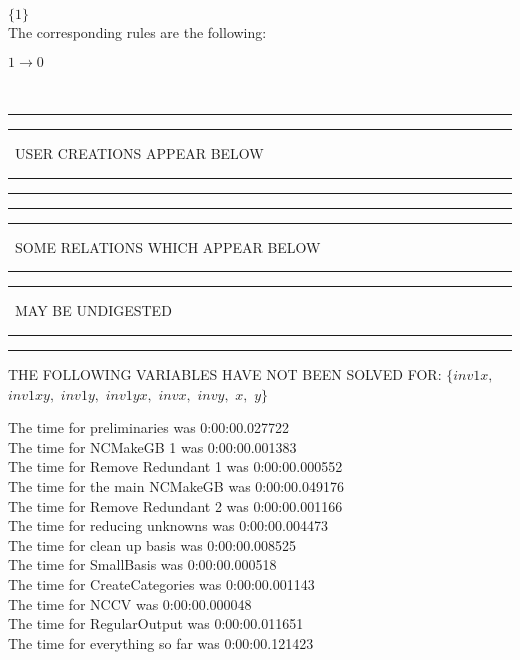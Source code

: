 \documentclass[rep10,leqno]{report}
\begin{document}
$\{1\}$
\smallskip\\
The corresponding rules are the following:\smallskip\\
\begin{minipage}{6in}
$
1\rightarrow 0
$
\end{minipage}\medskip\\
\rule[2pt]{6in}{1pt}\hfil\break
\rule[2.5pt]{1.701in}{1pt}
\ USER CREATIONS APPEAR BELOW\ 
\rule[2.5pt]{1.701in}{1pt}\hfil\break
\rule[2pt]{6in}{1pt}\hfil\break
\rule[2pt]{6in}{4pt}\hfil\break
\rule[2pt]{1.45in}{4pt}
\ SOME RELATIONS WHICH APPEAR BELOW\ 
\rule[2pt]{1.45in}{4pt}\hfil\break
\rule[2pt]{2.18in}{4pt}
\ MAY BE UNDIGESTED\ 
\rule[2pt]{2.18in}{4pt}\hfil\break
\rule[2pt]{6in}{4pt}\hfil\break
THE FOLLOWING VARIABLES HAVE NOT BEEN SOLVED FOR:\hfil\break
$\{inv1x,
$ $
inv1xy,
$ $
inv1y,
$ $
inv1yx,
$ $
invx,
$ $
invy,
$ $
x,
$ $
y\}$
\smallskip\\
\vspace{10pt}

\noindent
The time for preliminaries was 0:00:00.027722\\
The time for NCMakeGB 1 was 0:00:00.001383\\
The time for Remove Redundant 1 was 0:00:00.000552\\
The time for the main NCMakeGB was 0:00:00.049176\\
The time for Remove Redundant 2 was 0:00:00.001166\\
The time for reducing unknowns was 0:00:00.004473\\
The time for clean up basis was 0:00:00.008525\\
The time for SmallBasis was 0:00:00.000518\\
The time for CreateCategories was 0:00:00.001143\\
The time for NCCV was 0:00:00.000048\\
The time for RegularOutput was 0:00:00.011651\\
The time for everything so far was 0:00:00.121423\\
\end{document}
